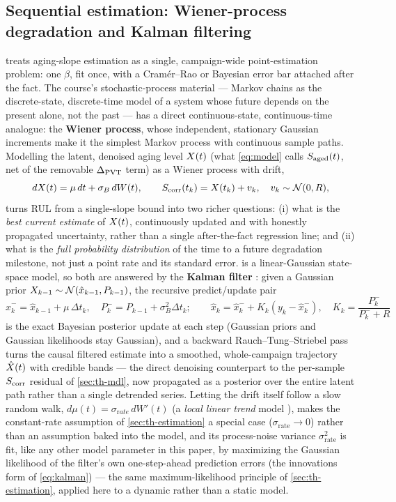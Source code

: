 \subsection{Sequential estimation: Wiener-process degradation and Kalman filtering}
\label{sec:th-wiener}
 treats aging-slope estimation as a single,
campaign-wide point-estimation problem: one $\beta$, fit once, with a
Cram\'er--Rao or Bayesian error bar attached after the fact. The course's
stochastic-process material --- Markov chains as the discrete-state,
discrete-time model of a system whose future depends on the present alone,
not the past --- has a direct continuous-state, continuous-time analogue: the
\textbf{Wiener process}, whose independent, stationary Gaussian increments
make it the simplest Markov process with continuous sample paths. Modelling
the latent, denoised aging level $X(t)$ (what \cref{eq:model} calls
$S_{\mathrm{aged}}(t)$, net of the removable $\Delta_{\mathrm{PVT}}$ term) as a Wiener process with drift,
\begin{equation}
  dX(t) = \mu\,dt + \sigma_B\,dW(t), \qquad
  S_{\mathrm{corr}}(t_k) = X(t_k) + v_k,\quad v_k\sim\mathcal N(0,R),
  \label{eq:wiener-model}
\end{equation}
turns RUL from a single-slope bound into two richer questions: (i) what is
the \emph{best current estimate} of $X(t)$, continuously updated and with
honestly propagated uncertainty, rather than a single after-the-fact
regression line; and (ii) what is the \emph{full probability distribution} of
the time to a future degradation milestone, not just a point rate and its
standard error.  is a linear-Gaussian state-space model,
so both are answered by the \textbf{Kalman filter} \cite{kalman1960}: given a
Gaussian prior $X_{k-1}\sim\mathcal N(\hat x_{k-1},P_{k-1})$, the recursive
predict/update pair
\begin{equation}
  \hat x_{k}^{-} = \hat x_{k-1}+\mu\,\Delta t_k,\quad
  P_{k}^{-} = P_{k-1}+\sigma_B^2\Delta t_k;\qquad
  \hat x_k = \hat x_k^{-} + K_k(y_k-\hat x_k^{-}),\quad
  K_k=\frac{P_k^{-}}{P_k^{-}+R}
  \label{eq:kalman}
\end{equation}
is the exact Bayesian posterior update at each step (Gaussian priors and
Gaussian likelihoods stay Gaussian), and a backward Rauch--Tung--Striebel pass
turns the causal filtered estimate into a smoothed, whole-campaign trajectory
$\hat{X}(t)$ with credible bands --- the direct denoising counterpart to the
per-sample $S_{\mathrm{corr}}$ residual of \cref{sec:th-mdl}, now propagated as a
posterior over the entire latent path rather than a single detrended series.
Letting the drift itself follow a slow random walk, $d\mu(t)=\sigma_{\mathrm
rate}\,dW'(t)$ (a \emph{local linear trend} model \cite{harvey1989}), makes
the constant-rate assumption of \cref{sec:th-estimation} a special case
($\sigma_{\mathrm{rate}}\to0$) rather than an assumption baked into the model,
and its process-noise variance $\sigma_{\mathrm{rate}}^2$ is fit, like any
other model parameter in this paper, by maximizing the Gaussian likelihood of
the filter's own one-step-ahead prediction errors (the innovations
form of \cref{eq:kalman}) --- the same maximum-likelihood principle of
\cref{sec:th-estimation}, applied here to a dynamic rather than a static model.


